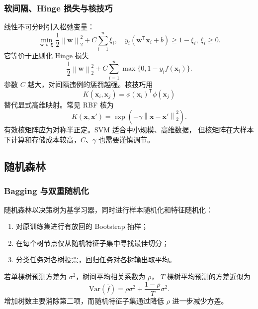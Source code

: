 \documentclass[UTF8,zihao=-4,a4paper,fontset=windows]{ctexart}
\newcommand{\norm}[1]{\left\lVert #1\right\rVert}
\begin{document}
\subsubsection{软间隔、Hinge 损失与核技巧}

线性不可分时引入松弛变量：
\begin{equation}
  \min_{\bm{w},b,\bm{\xi}}
  \frac{1}{2}\norm{\bm{w}}_2^2
  +C\sum_{i=1}^{n}\xi_i,
  \quad
  y_i(\bm{w}^{\mathsf T}\bm{x}_i+b)\ge1-\xi_i,\ \xi_i\ge0.
\end{equation}
它等价于正则化 Hinge 损失
\begin{equation}
  \frac{1}{2}\norm{\bm{w}}_2^2+
  C\sum_{i=1}^{n}
  \max\{0,1-y_i f(\bm{x}_i)\}.
\end{equation}
参数 $C$ 越大，对间隔违例的惩罚越强。核技巧用
\begin{equation}
  K(\bm{x}_i,\bm{x}_j)
  =\phi(\bm{x}_i)^{\mathsf T}\phi(\bm{x}_j)
\end{equation}
替代显式高维映射。常见 RBF 核为
\begin{equation}
  K(\bm{x},\bm{x}')
  =\exp(-\gamma\norm{\bm{x}-\bm{x}'}_2^2).
\end{equation}
有效核矩阵应为对称半正定。SVM 适合中小规模、高维数据，
但核矩阵在大样本下计算和存储成本较高，$C$、$\gamma$ 也需要谨慎调节。

\subsection{随机森林}

\subsubsection{Bagging 与双重随机化}

随机森林以决策树为基学习器，同时进行样本随机化和特征随机化\cite{breiman}：
\begin{enumerate}
  \item 对原训练集进行有放回的 Bootstrap 抽样；
  \item 在每个树节点仅从随机特征子集中寻找最佳切分；
  \item 分类任务对各树投票，回归任务对各树输出取平均。
\end{enumerate}
若单棵树预测方差为 $\sigma^2$，树间平均相关系数为 $\rho$，
$T$ 棵树平均预测的方差近似为
\begin{equation}
  \mathrm{Var}(\bar f)
  =\rho\sigma^2+\frac{1-\rho}{T}\sigma^2.
\end{equation}
增加树数主要消除第二项，而随机特征子集通过降低 $\rho$ 进一步减少方差。
\end{document}
